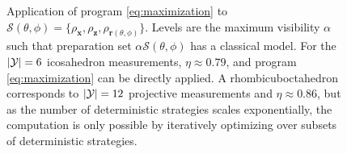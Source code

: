 \documentclass[a4paper,preprintnumbers,floatfix,superscriptaddress,pra,twocolumn,showpacs,notitlepage,longbibliography]{revtex4-2}
\begin{document}
\begin{figure}[t!]
        \centering
        \caption{Application of program \eqref{eq:maximization} to $\mathcal{S}(\theta, \phi) = \{ \rho_{\bm{x}}, \rho_{\bm{z}}, \rho_{\bm{r}(\theta, \phi)} \}$. Levels are the maximum visibility $\alpha$ such that preparation set $\alpha \mathcal{S}(\theta, \phi)$ has a classical model.  For the $\abs{\mathcal{Y}} = 6$ icosahedron measurements, $\eta \approx 0.79$, and program \eqref{eq:maximization} can be directly applied.  A rhombicuboctahedron corresponds to $\abs{\mathcal{Y}} = 12$ projective measurements and $\eta \approx 0.86$, but as the number of deterministic strategies scales exponentially, the computation is only possible by iteratively optimizing over subsets of deterministic strategies.}
    \end{figure}
    
    
\end{document}
